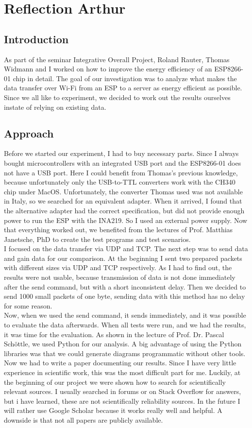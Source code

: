 \chapter*{Reflection Arthur}

\section*{Introduction}
As part of the seminar Integrative Overall Project, Roland Rauter,
Thomas Widmann and I worked on how to improve the energy efficiency of an ESP8266-01 chip in detail.
The goal of our investigation was to analyze what makes the data transfer over Wi-Fi
from an ESP to a server as energy efficient as possible.
Since we all like to experiment,
we decided to work out the results ourselves instate of relying on existing data.


\section*{Approach}
Before we started our experiment, I had to buy necessary parts.
Since I always bought microcontrollers with an integrated USB port and the ESP8266-01
does not have a USB port. Here I could benefit from Thomas's previous knowledge,
because unfortunately only the USB-to-TTL converters work with the CH340 chip under MacOS.
Unfortunately, the converter Thomas used was not available in Italy,
so we searched for an equivalent adapter. When it arrived,
I found that the alternative adapter had the correct specification,
but did not provide enough power to run the ESP with the INA219.
So I used an external power supply. Now that everything worked out,
we benefited from the lectures of Prof. Matthias Janetsche, PhD
to create the test programs and test scenarios. \\
I focused on the data transfer via UDP and TCP.
The next step was to send data and gain data for our comparison.
At the beginning I sent two prepared packets with different sizes via UDP and TCP respectively.
As I had to find out, the results were not usable,
because transmission of data is not done immediately after the send command,
but with a short inconsistent delay.
Then we decided to send 1000 small packets of one byte,
sending data with this method has no delay for some reason.\\
Now,
when we used the send command, it sends immediately,
and it was possible to evaluate the data afterwards.
When all tests were run, and we had the results, it was time for the evaluation.
As shown in the lecture of Prof. Dr. Pascal Schöttle, we used Python for our analysis.
A big advantage of using the Python libraries was that we could generate diagrams programmatic
without other tools. Now we had to write a paper documenting our results.
Since I have very little experience in scientific work, this was the most difficult part for me.
Luckily, at the beginning of our project we were shown how to search for scientifically
relevant sources. I usually searched in forums or on Stack Overflow for answers,
but i have learned, these are not scientifically reliability sources.
In the future I will rather use Google Scholar because it works really well and helpful.
A downside is that not all papers are publicly available.


